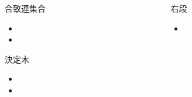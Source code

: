 \documentclass[final,hyperref={pdfpagelabels=false}]{beamer}
\begin{document}
\begin{frame}[t]{}
\begin{columns}[t]
\begin{column}{.49\linewidth}
     \begin{block}{合致連集合}
      \begin{itemize}
        \item 
        \item 
     \end{itemize}
     \end{block}

     \begin{block}{決定木}
      \begin{itemize}
        \item 
        \item 
     \end{itemize}
     \end{block}


    \end{column}
    \begin{column}{.49\linewidth}
     \begin{exampleblock}{\LARGE 右段}
      \begin{itemize}
        \item 
      \end{itemize}
        \vspace*{10cm}
     \end{exampleblock}
    \end{column}
  \end{columns}
 \end{frame}
\end{document}
